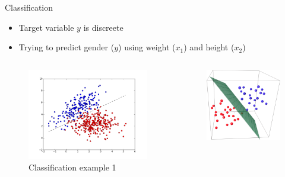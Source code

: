\documentclass[aspectratio=169]{beamer}
\begin{document}
\begin{frame}{Classification}
    \begin{itemize}
        \item Target variable $y$ is discreete
        \item Trying to predict gender ($y$) using weight ($x_1$) and height ($x_2$)
    \end{itemize}

    \begin{columns}
    \begin{column}{0.5\textwidth}
        \begin{center}
            \begin{figure}
                \includegraphics[scale=0.4]{./images/classification02.png}
                \caption{Classification example 1}
            \end{figure}
        \end{center}
    \end{column}
    \begin{column}{0.5\textwidth}  %
        \begin{center}
            \begin{figure}
                \includegraphics[scale=0.35]{./images/classification01.png}

\end{figure}
\end{center}
\end{column}
\end{columns}
\end{frame}
\end{document}
